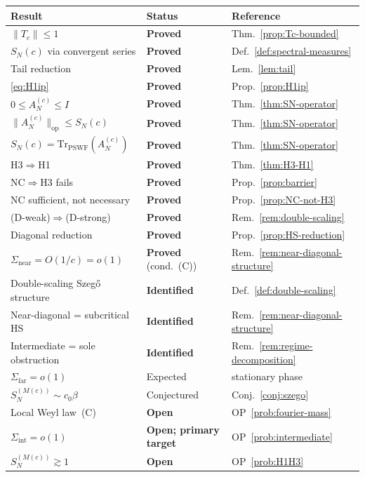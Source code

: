 \documentclass[12pt,a4paper]{amsart}
\theoremstyle{definition}
\theoremstyle{remark}
\newcommand{\norm}[1]{\|#1\|}
\newcommand{\Ac}{A_N^{(c)}}
\begin{document}
\begin{center}
\renewcommand{\arraystretch}{1.25}
\begin{tabular}{lll}
\toprule
Result & Status & Reference \\
\midrule
$\norm{T_c}\le 1$
  & \textbf{Proved}
  & Thm.~\ref{prop:Tc-bounded} \\
$S_N(c)$ via convergent series
  & \textbf{Proved}
  & Def.~\ref{def:spectral-measures} \\
Tail reduction
  & \textbf{Proved}
  & Lem.~\ref{lem:tail} \\
\eqref{eq:H1ip}
  & \textbf{Proved}
  & Prop.~\ref{prop:H1ip} \\
$0\le\Ac\le I$
  & \textbf{Proved}
  & Thm.~\ref{thm:SN-operator} \\
$\norm{\Ac}_{\mathrm{op}}\le S_N(c)$
  & \textbf{Proved}
  & Thm.~\ref{thm:SN-operator} \\
$S_N(c)=\mathrm{Tr}_{\mathrm{PSWF}}(\Ac)$
  & \textbf{Proved}
  & Thm.~\ref{thm:SN-operator} \\
H3$\Rightarrow$H1
  & \textbf{Proved}
  & Thm.~\ref{thm:H3-H1} \\
NC$\Rightarrow$H3 fails
  & \textbf{Proved}
  & Prop.~\ref{prop:barrier} \\
NC sufficient, not necessary
  & \textbf{Proved}
  & Prop.~\ref{prop:NC-not-H3} \\
(D-weak)$\Rightarrow$(D-strong)
  & \textbf{Proved}
  & Rem.~\ref{rem:double-scaling} \\
Diagonal reduction
  & \textbf{Proved}
  & Prop.~\ref{prop:HS-reduction} \\
$\Sigma_{\mathrm{near}}=O(1/c)=o(1)$
  & \textbf{Proved} (cond.\ (C))
  & Rem.~\ref{rem:near-diagonal-structure} \\
Double-scaling Szeg\H{o} structure
  & \textbf{Identified}
  & Def.~\ref{def:double-scaling} \\
Near-diagonal = subcritical HS
  & \textbf{Identified}
  & Rem.~\ref{rem:near-diagonal-structure} \\
Intermediate = sole obstruction
  & \textbf{Identified}
  & Rem.~\ref{rem:regime-decomposition} \\
$\Sigma_{\mathrm{far}}=o(1)$
  & Expected
  & stationary phase \\
$S_N^{(M(c))}\sim c_0\beta$
  & Conjectured
  & Conj.~\ref{conj:szego} \\
Local Weyl law~(C)
  & \textbf{Open}
  & OP~\ref{prob:fourier-mass} \\
$\Sigma_{\mathrm{int}}=o(1)$
  & \textbf{Open; primary target}
  & OP~\ref{prob:intermediate} \\
$S_N^{(M(c))}\gtrsim 1$
  & \textbf{Open}
  & OP~\ref{prob:H1H3} \\
\bottomrule
\end{tabular}
\end{center}
\end{document}
